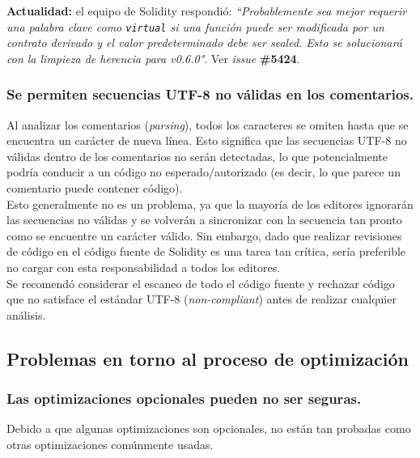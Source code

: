 \textbf{Actualidad:} el equipo de Solidity respondió: \textit{``Probablemente sea mejor requerir una palabra clave como \texttt{virtual} si una función puede ser modificada por un contrato derivado y el valor predeterminado debe ser sealed. Esto se solucionará con la limpieza de herencia para v0.6.0"}\cite{GHProject9}. Ver \textit{issue} \textbf{\#5424}\cite{GHI5424}.\\

\subsubsection{Se permiten secuencias UTF-8 no válidas en los comentarios.}

Al analizar los comentarios (\textit{parsing}), todos los caracteres se omiten hasta que se encuentra un carácter de nueva línea. Esto significa que las secuencias UTF-8 no válidas dentro de los comentarios no serán detectadas, lo que potencialmente podría conducir a un código no esperado/autorizado (es decir, lo que parece un comentario puede contener código).\\

Esto generalmente no es un problema, ya que la mayoría de los editores ignorarán las secuencias no válidas y se volverán a sincronizar con la secuencia tan pronto como se encuentre un carácter válido. Sin embargo, dado que realizar revisiones de código en el código fuente de Solidity es una tarea tan crítica, sería preferible no cargar con esta responsabilidad a todos los editores.\\

Se recomendó considerar el escaneo de todo el código fuente y rechazar código que no satisface el estándar UTF-8 (\textit{non-compliant}) antes de realizar cualquier análisis.\\

\subsection{Problemas en torno al proceso de optimización}

\subsubsection{Las optimizaciones opcionales pueden no ser seguras.}

Debido a que algunas optimizaciones son opcionales, no están tan probadas como otras optimizaciones comúnmente usadas.\\

